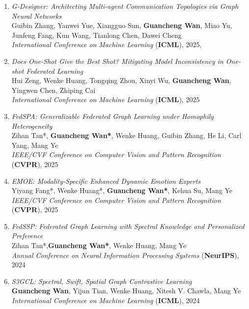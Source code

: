 \begin{enumerate}
    \item \textit{G-Designer: Architecting Multi-agent Communication Topologies via Graph Neural Networks} \\
    Guibin Zhang, Yanwei Yue, Xiangguo Sun, \textbf{Guancheng Wan}, Miao Yu, Junfeng Fang, Kun Wang, Tianlong Chen, Dawei Cheng \\
    \hfill \textit{International Conference on Machine Learning} (\textbf{ICML}), 2025, {}

    \item \textit{Does One-Shot Give the Best Shot? Mitigating Model Inconsistency in One-shot Federated Learning} \\
    Hui Zeng, Wenke Huang, Tongqing Zhou, Xinyi Wu, \textbf{Guancheng Wan}, Yingwen Chen, Zhiping Cai \\
    \hfill \textit{International Conference on Machine Learning} (\textbf{ICML}), 2025

    \item \textit{FedSPA: Generalizable Federated Graph Learning under Homophily Heterogeneity} \\
    Zihan Tan*, \textbf{Guancheng Wan*}, Wenke Huang, Guibin Zhang, He Li, Carl Yang, Mang Ye \\
    \hfill \textit{IEEE/CVF Conference on Computer Vision and Pattern Recognition} (\textbf{CVPR}), 2025

    \item \textit{EMOE: Modality-Specific Enhanced Dynamic Emotion Experts} \\
    Yiyang Fang*, Wenke Huang*, \textbf{Guancheng Wan*}, Kehua Su, Mang Ye \\
    \hfill \textit{IEEE/CVF Conference on Computer Vision and Pattern Recognition} (\textbf{CVPR}), 2025

    \item \textit{FedSSP: Federated Graph Learning with Spectral Knowledge and Personalized Preference} \\
    Zihan Tan*,\textbf{Guancheng Wan*}, Wenke Huang, Mang Ye \\
    \hfill \textit{Annual Conference on Neural Information Processing Systems} (\textbf{NeurIPS}), 2024

    \item \textit{S3GCL: Spectral, Swift, Spatial Graph Contrastive Learning} \\
    \textbf{Guancheng Wan}, Yijun Tian, Wenke Huang, Nitesh V. Chawla, Mang Ye \\
    \hfill \textit{International Conference on Machine Learning} (\textbf{ICML}), 2024


\end{enumerate}
